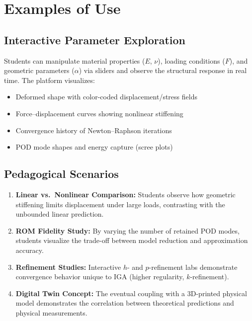 \section{Examples of Use}
\label{sec:examples}

\subsection{Interactive Parameter Exploration}

Students can manipulate material properties ($E$, $\nu$), loading conditions ($F$), and geometric parameters ($\alpha$) via sliders and observe the structural response in real time. The platform visualizes:
\begin{itemize}
    \item Deformed shape with color-coded displacement/stress fields
    \item Force--displacement curves showing nonlinear stiffening
    \item Convergence history of Newton--Raphson iterations
    \item POD mode shapes and energy capture (scree plots)
\end{itemize}

\subsection{Pedagogical Scenarios}

\begin{enumerate}
    \item \textbf{Linear vs.\ Nonlinear Comparison:} Students observe how geometric stiffening limits displacement under large loads, contrasting with the unbounded linear prediction.
    
    \item \textbf{ROM Fidelity Study:} By varying the number of retained POD modes, students visualize the trade-off between model reduction and approximation accuracy.
    
    \item \textbf{Refinement Studies:} Interactive $h$- and $p$-refinement labs demonstrate convergence behavior unique to IGA (higher regularity, $k$-refinement).
    
    \item \textbf{Digital Twin Concept:} The eventual coupling with a 3D-printed physical model demonstrates the correlation between theoretical predictions and physical measurements.
\end{enumerate}
